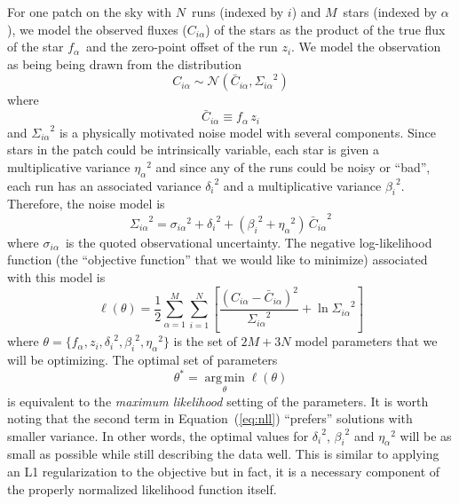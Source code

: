 \documentclass[12pt,preprint]{aastex}
\newcommand{\Eq}[1]{Equation~(\ref{eq:#1})}
\newcommand{\eq}[1]{\Eq{#1}}
\newcommand{\eqlabel}[1]{\label{eq:#1}}
\newcommand{\normal}[1]{\ensuremath{\mathcal{N} \left (#1\right )}}
\newcommand{\nstars}{\ensuremath{M}}
\newcommand{\nobs}  {\ensuremath{N}}
\newcommand{\st}    {\ensuremath{\alpha}}
\newcommand{\obs}   {\ensuremath{i}}
\newcommand{\jabs}  {\ensuremath{\delta_\obs}}
\newcommand{\vs}    {\ensuremath{\eta_\st}}
\newcommand{\vo}    {\ensuremath{\beta_\obs}}
\newcommand{\sigobs}{\ensuremath{\sigma_{\obs\st}}}
\newcommand{\sig}   {\ensuremath{\Sigma_{\obs\st}}}
\newcommand{\fstar} {\ensuremath{f_\st}}
\newcommand{\fobs}  {\ensuremath{z_\obs}}
\newcommand{\Cobs}  {\ensuremath{C_{\obs\st}}}
\newcommand{\Cmod}  {\ensuremath{\bar{C}_{\obs\st}}}
\begin{document}
For one patch on the sky with \nobs\ runs (indexed by \obs ) and \nstars\
stars (indexed by \st ), we model the observed fluxes (\Cobs ) of the
stars as the product of the true flux of the star \fstar\ and the zero-point
offset of the run \fobs. We model the
observation as being being drawn from the distribution
\begin{equation}
    \Cobs \sim \normal{\Cmod, \sig^2}
\end{equation}
where
\begin{equation}
    \Cmod \equiv \fstar \, \fobs
\end{equation}
and $\sig^2$ is a physically motivated noise model with several components.
Since stars in the patch could be intrinsically variable, each star is
given a multiplicative variance $\vs^2$ and since any of the runs could be
noisy or ``bad'', each run has an associated variance $\jabs^2$ and a
multiplicative variance $\vo^2$. Therefore, the
noise model is
\begin{equation}
    \sig^2 = \sigobs^2 + \jabs^2 + \left ( \vo^2 + \vs^2 \right ) \, \Cmod^2
\end{equation}
where \sigobs\ is the quoted observational uncertainty. The negative
log-likelihood function (the ``objective function'' that we would like to
minimize) associated with this model is
\begin{equation}\eqlabel{nll}
    \ell (\theta) = \frac{1}{2} \sum_{\st=1}^\nstars \sum_{\obs=1}^\nobs
        \left [
            \frac{(\Cobs - \Cmod)^2}{\sig^2} + \ln \sig^2
        \right ]
\end{equation}
where $\theta = \{ \fstar, \fobs, \jabs^2, \vo^2, \vs^2 \}$ is the set of
$2\nstars + 3\nobs$ model parameters that we will be optimizing. The
optimal set of parameters
\begin{equation}
    \theta^* = \operatorname*{arg\,min}_\theta \ell (\theta)
\end{equation}
is equivalent to the \emph{maximum likelihood} setting of the parameters.
It is worth noting that the second term in \eq{nll} ``prefers'' solutions
with smaller variance. In other words, the optimal values for $\jabs^2$,
$\vo^2$ and $\vs^2$ will be as small as possible while still describing the
data well. This is similar to applying an L1 regularization to the objective
but in fact, it is a necessary component of the properly normalized
likelihood function itself.
\end{document}
